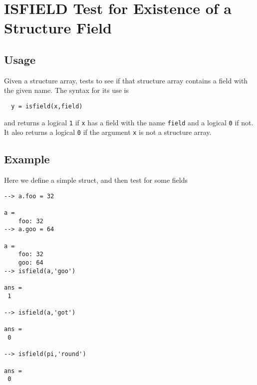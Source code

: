 \section{ISFIELD Test for Existence of a Structure Field}

\subsection{Usage}

Given a structure array, tests to see if that structure
array contains a field with the given name.  The syntax
for its use is
\begin{verbatim}
  y = isfield(x,field)
\end{verbatim}
and returns a logical \verb|1| if \verb|x| has a field with the 
name \verb|field| and a logical \verb|0| if not.  It also returns
a logical \verb|0| if the argument \verb|x| is not a structure array.
\subsection{Example}

Here we define a simple struct, and then test for some 
fields
\begin{verbatim}
--> a.foo = 32

a = 
    foo: 32
--> a.goo = 64

a = 
    foo: 32
    goo: 64
--> isfield(a,'goo')

ans = 
 1 

--> isfield(a,'got')

ans = 
 0 

--> isfield(pi,'round')

ans = 
 0 
\end{verbatim}
